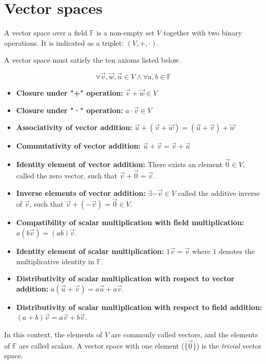 \chapter{Vector spaces}

A vector space over a field \(\mathbb F\) is a non-empty set \(V\) together with two binary operations. It is indicated as a triplet: $(V, +, \cdot)$.

A vector space must satisfy the ten axioms listed below.

{\large$$\forall \vec v, \vec w, \vec u \in V \land \forall a, b \in \mathbb F$$}

\begin{itemize}
\item \textbf{Closure under "+" operation:}
    $\vec v + \vec w \in V$
\item \textbf{Closure under "·" operation:}
    $a \cdot \vec v \in V$
\item \textbf{Associativity of vector addition:} $\vec{u} + (\vec{v} + \vec{w}) = (\vec{u} + \vec{v}) + \vec{w}$
\item \textbf{Commutativity of vector addition:} $\vec{u} + \vec{v} = \vec{v} + \vec{u}$
\item \textbf{Identity element of vector addition:} There exists an element $\vec{0} \in V$, called the zero vector, such that $\vec{v} + \vec{0} = \vec{v}$.
\item \textbf{Inverse elements of vector addition:} $\exists -\vec{v} \in V$ called the additive inverse of $\vec{v}$, such that $\vec{v} + (-\vec{v}) = \vec{0} \in V$.
\item \textbf{Compatibility of scalar multiplication with field multiplication:} $a(b\vec{v}) = (ab)\vec{v}$.
\item \textbf{Identity element of scalar multiplication:} $1\vec{v} = \vec{v}$ where $1$ denotes the multiplicative identity in $\mathbb F$.
\item \textbf{Distributivity of scalar multiplication with respect to vector addition:} $a(\vec{u} + \vec{v}) = a\vec{u} + a\vec{v}$.
\item \textbf{Distributivity of scalar multiplication with respect to field addition:} $(a + b)\vec{v} = a\vec{v} + b\vec{v}$.
\end{itemize}

In this context, the elements of \(V\) are commonly called vectors, and the elements of \(\mathbb F\) are called scalars.
A vector space with one element {\normalfont ($\{\vec 0\}$)} is the \emph{trivial} vector space.
\\

